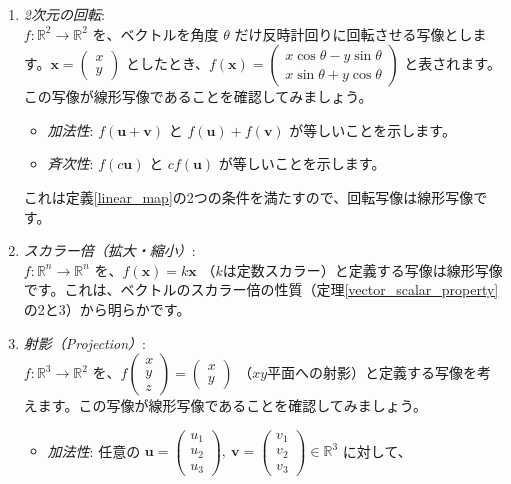 \begin{ex}
\begin{enumerate}
\item \emph{2次元の回転}:\\
    $f: \mathbb{R}^2 \to \mathbb{R}^2$ を、ベクトルを角度 $\theta$ だけ反時計回りに回転させる写像とします。$\bm{x} = \begin{pmatrix} x \\ y \end{pmatrix}$ としたとき、$f(\bm{x}) = \begin{pmatrix} x\cos\theta - y\sin\theta \\ x\sin\theta + y\cos\theta \end{pmatrix}$ と表されます。この写像が線形写像であることを確認してみましょう。
	\begin{itemize}
	\item \emph{加法性}: $f(\bm{u} + \bm{v})$ と $f(\bm{u}) + f(\bm{v})$ が等しいことを示します。
    \item \emph{斉次性}: $f(c\bm{u})$ と $c f(\bm{u})$ が等しいことを示します。
    \end{itemize}
    これは定義\ref{linear_map}の2つの条件を満たすので、回転写像は線形写像です。
\item \emph{スカラー倍（拡大・縮小）}:\\
    $f: \mathbb{R}^n \to \mathbb{R}^n$ を、$f(\bm{x}) = k\bm{x}$ （$k$は定数スカラー）と定義する写像は線形写像です。これは、ベクトルのスカラー倍の性質（定理\ref{vector_scalar_property}の2と3）から明らかです。
\item \emph{射影（Projection）}:\\
    $f: \mathbb{R}^3 \to \mathbb{R}^2$ を、$f\begin{pmatrix} x \\ y \\ z \end{pmatrix} = \begin{pmatrix} x \\ y \end{pmatrix}$ （$xy$平面への射影）と定義する写像を考えます。この写像が線形写像であることを確認してみましょう。
    \begin{itemize}
    \item \emph{加法性}: 任意の $\bm{u}=\begin{pmatrix} u_1 \\ u_2 \\ u_3 \end{pmatrix},\ \bm{v}=\begin{pmatrix} v_1 \\ v_2 \\ v_3 \end{pmatrix} \in \mathbb{R}^3$ に対して、

\end{itemize}
\end{enumerate}
\end{ex}
